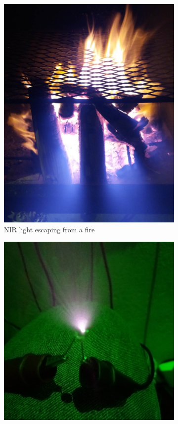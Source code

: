 \begin{figure}[H]
\begin{subfigure}{0.5\textwidth}
\centering
\includegraphics[scale=0.2]{images/fire_ir.jpg}
\caption{NIR light escaping from a fire}
\label{fig:fire_ir}
\end{subfigure}
\begin{subfigure}{0.5\textwidth}
\centering
\includegraphics[scale=0.219]{images/ir_led.jpg}

\end{subfigure}
\end{figure}
